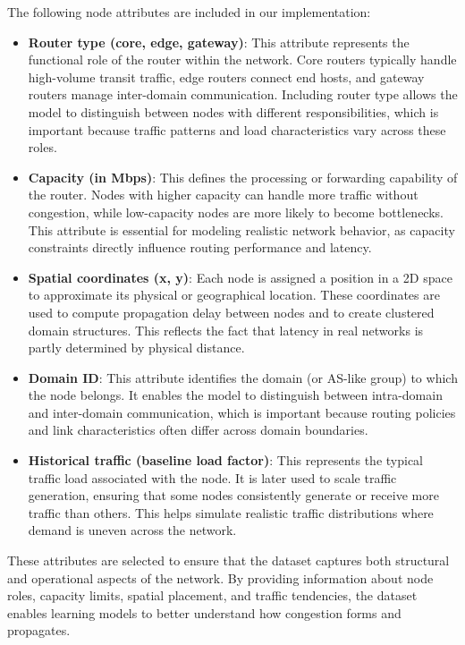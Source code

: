 \documentclass[12pt]{article}
\begin{document}
The following node attributes are included in our implementation:
\begin{itemize}
    \item \textbf{Router type (core, edge, gateway)}: This attribute represents the functional role of the router within the network. Core routers typically handle high-volume transit traffic, edge routers connect end hosts, and gateway routers manage inter-domain communication. Including router type allows the model to distinguish between nodes with different responsibilities, which is important because traffic patterns and load characteristics vary across these roles.
    \item \textbf{Capacity (in Mbps)}: This defines the processing or forwarding capability of the router. Nodes with higher capacity can handle more traffic without congestion, while low-capacity nodes are more likely to become bottlenecks. This attribute is essential for modeling realistic network behavior, as capacity constraints directly influence routing performance and latency.
    \item \textbf{Spatial coordinates (x, y)}: Each node is assigned a position in a 2D space to approximate its physical or geographical location. These coordinates are used to compute propagation delay between nodes and to create clustered domain structures. This reflects the fact that latency in real networks is partly determined by physical distance.
    \item \textbf{Domain ID}: This attribute identifies the domain (or AS-like group) to which the node belongs. It enables the model to distinguish between intra-domain and inter-domain communication, which is important because routing policies and link characteristics often differ across domain boundaries.
    \item \textbf{Historical traffic (baseline load factor)}: This represents the typical traffic load associated with the node. It is later used to scale traffic generation, ensuring that some nodes consistently generate or receive more traffic than others. This helps simulate realistic traffic distributions where demand is uneven across the network.
\end{itemize}

These attributes are selected to ensure that the dataset captures both structural and operational aspects of the network. By providing information about node roles, capacity limits, spatial placement, and traffic tendencies, the dataset enables learning models to better understand how congestion forms and propagates.
\end{document}
